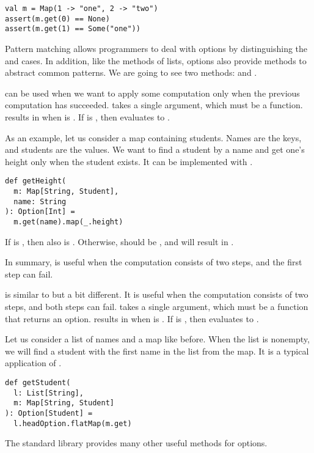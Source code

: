 \begin{verbatim}
val m = Map(1 -> "one", 2 -> "two")
assert(m.get(0) == None)
assert(m.get(1) == Some("one"))
\end{verbatim}

Pattern matching allows programmers to deal with options by
distinguishing the  and  cases. In addition, like the
methods of lists, options also provide methods to abstract common patterns.
We are going to see two methods:  and .

 can be used when we want to apply some computation only when the
previous computation has succeeded.  takes a single argument, which
must be a function.  results in  when  is
. If  is , then  evaluates
to .

As an example, let us consider a map containing students.
Names are the keys, and students are the values. We want to find a student by a name and
get one's height only when the student exists. It can be implemented with
.

\begin{verbatim}
def getHeight(
  m: Map[String, Student],
  name: String
): Option[Int] =
  m.get(name).map(_.height)
\end{verbatim}

If  is , then  also
is . Otherwise,  should be , and
 will result in .

In summary,  is useful when the computation consists of two steps, and
the first step can fail.

 is similar to  but a bit different. It is useful when
the computation consists of two steps, and both steps can fail.
 takes a single argument, which must be a function that returns an option.
 results in  when  is
. If  is , then  evaluates
to .

Let us consider a list of names and a map like before.
When the list is nonempty, we will find a student with the first name in the
list from the map. It is a typical application of .

\begin{verbatim}
def getStudent(
  l: List[String],
  m: Map[String, Student]
): Option[Student] =
  l.headOption.flatMap(m.get)
\end{verbatim}

The standard library provides many other useful methods for
options.
